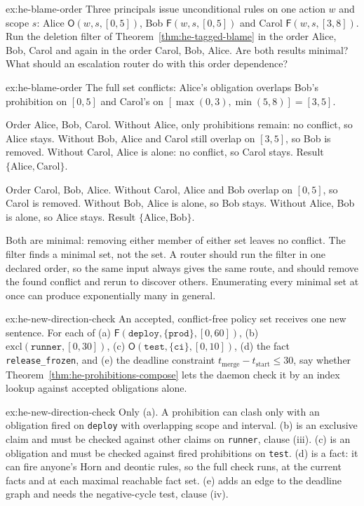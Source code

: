 
\begin{pdexercise}[kind=Trace,rating=2]{ex:he-blame-order}
Three principals issue unconditional rules on one action $w$ and scope $s$:
Alice $\mathsf{O}(w,s,[0,5])$, Bob $\mathsf{F}(w,s,[0,5])$ and Carol
$\mathsf{F}(w,s,[3,8])$. Run the deletion filter of
Theorem~\ref{thm:he-tagged-blame} in the order Alice, Bob, Carol and again in
the order Carol, Bob, Alice. Are both results minimal? What should an
escalation router do with this order dependence?
\end{pdexercise}
\begin{pdsolution}{ex:he-blame-order}
The full set conflicts: Alice's obligation overlaps Bob's prohibition on
$[0,5]$ and Carol's on $[\max(0,3),\min(5,8)]=[3,5]$.

Order Alice, Bob, Carol. Without Alice, only prohibitions remain: no conflict,
so Alice stays. Without Bob, Alice and Carol still overlap on $[3,5]$, so Bob
is removed. Without Carol, Alice is alone: no conflict, so Carol stays. Result
$\{\text{Alice},\text{Carol}\}$.

Order Carol, Bob, Alice. Without Carol, Alice and Bob overlap on $[0,5]$, so
Carol is removed. Without Bob, Alice is alone, so Bob stays. Without Alice,
Bob is alone, so Alice stays. Result $\{\text{Alice},\text{Bob}\}$.

Both are minimal: removing either member of either set leaves no conflict. The
filter finds a minimal set, not the set. A router should run the filter in one
declared order, so the same input always gives the same route, and should
remove the found conflict and rerun to discover others. Enumerating every
minimal set at once can produce exponentially many in general.
\end{pdsolution}
\begin{pdexercise}[kind=Check,rating=1]{ex:he-new-direction-check}
An accepted, conflict-free policy set receives one new sentence. For each of
(a) $\mathsf{F}(\texttt{deploy},\{\texttt{prod}\},[0,60])$,
(b) $\mathrm{excl}(\texttt{runner},[0,30])$,
(c) $\mathsf{O}(\texttt{test},\{\texttt{ci}\},[0,10])$,
(d) the fact \texttt{release\_frozen}, and
(e) the deadline constraint $t_{\mathrm{merge}}-t_{\mathrm{start}}\le30$,
say whether Theorem~\ref{thm:he-prohibitions-compose} lets the daemon check it
by an index lookup against accepted obligations alone.
\end{pdexercise}
\begin{pdsolution}{ex:he-new-direction-check}
Only (a). A prohibition can clash only with an obligation fired on
\texttt{deploy} with overlapping scope and interval. (b) is an exclusive claim
and must be checked against other claims on \texttt{runner}, clause (iii).
(c) is an obligation and must be checked against fired prohibitions on
\texttt{test}. (d) is a fact: it can fire anyone's Horn and deontic rules, so
the full check runs, at the current facts and at each maximal reachable fact
set. (e) adds an edge to the deadline graph and needs the negative-cycle test,
clause (iv).
\end{pdsolution}
